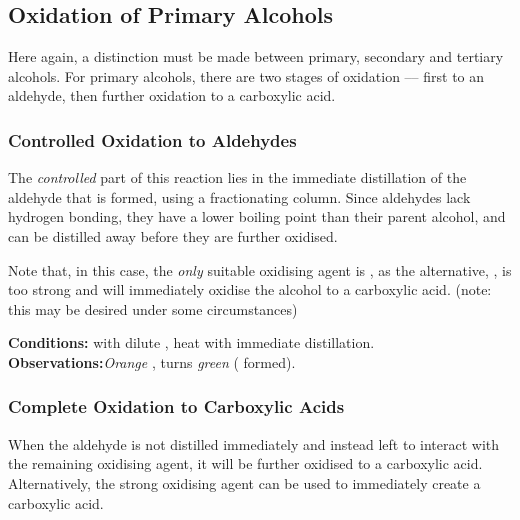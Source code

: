 		\subsection{Oxidation of Primary Alcohols}

			Here again, a distinction must be made between primary, secondary and tertiary alcohols. For primary alcohols, there
			are two stages of oxidation –– first to an aldehyde, then further oxidation to a carboxylic acid.

			\subsubsection{Controlled Oxidation to Aldehydes}

				The \textit{controlled} part of this reaction lies in the immediate distillation of the aldehyde that is formed, using
				a fractionating column. Since aldehydes lack hydrogen bonding, they have a lower boiling point than their parent alcohol,
				and can be distilled away before they are further oxidised.

				Note that, in this case, the \textit{only} suitable oxidising agent is , as the alternative, , is
				too strong and will immediately oxidise the alcohol to a carboxylic acid. (note: this may be desired under some circumstances)


				\vspace{1.5em}
				\vbox{\textbf{Conditions:}	\tabto{35mm} with dilute ,
											\tabto{35mm}heat with immediate distillation.}
				\vspace{0.5em}
				\vbox{\textbf{Observations:}\tabto{35mm}\textit{\color{BurntOrange}Orange} , turns \textit{\color{LimeGreen}green}
														( formed).}




			\pagebreak
			\subsubsection{Complete Oxidation to Carboxylic Acids}

				When the aldehyde is not distilled immediately and instead left to interact with the remaining oxidising agent, it will
				be further oxidised to a carboxylic acid. Alternatively, the strong oxidising agent  can be used to immediately
				create a carboxylic acid.

